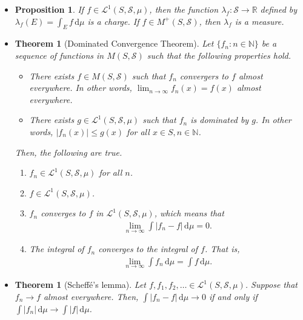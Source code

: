 \documentclass[10pt]{article}
\newtheorem{theorem}[lemma]{Theorem}
\newtheorem{proposition}[lemma]{Proposition}
\numberwithin{lemma}{section}
\newcommand{\dee}{\mathrm{d}}
\newcommand{\mcal}[1]{\mathcal{#1}}
\newcommand{\Real}{\mathbb{R}}
\newcommand{\Nat}{\mathbb{N}}
\begin{document}
\begin{itemize}
  \item \begin{proposition} \label{proposition:change-from-integral}
    If $f \in \mcal{L}^1(S,\mcal{S},\mu)$, then the function $\lambda_f : \mcal{S} \rightarrow \Real$ defined by $ \lambda_f(E) = \int_E f\, \dee\mu $ is a charge. If $f \in M^+(S,\mcal{S})$, then $\lambda_f$ is a measure.
  \end{proposition}

  \item \begin{theorem}[Dominated Convergence Theorem]
    Let $\{f_n : n \in \Nat\}$ be a sequence of functions in $M(S,\mcal{S})$ such that the following properties hold.
    \begin{itemize}
      \item There exists $f \in M(S,\mcal{S})$ such that $f_n$ convergers to $f$ almost everywhere. In other words, $\lim_{n \rightarrow \infty} f_n(x) = f(x)$ almost everywhere.
      \item There exists $g \in \mcal{L}^1(S,\mcal{S},\mu)$ such that $f_n$ is dominated by $g$. In other words, $|f_n(x)| \leq g(x)$ for all $x\in S, n \in \Nat$.
    \end{itemize}
    Then, the following are true.
    \begin{enumerate}
      \item $f_n \in \mcal{L}^1(S,\mcal{S},\mu)$ for all $n$.
      \item $f \in \mcal{L}^1(S,\mcal{S},\mu)$.
      \item $f_n$ converges to $f$ in $\mcal{L}^1(S, \mcal{S}, \mu)$, which means that
      \begin{align*}
        \lim_{n \rightarrow \infty} \int |f_n - f|\, \dee\mu = 0.
      \end{align*}
      \item The integral of $f_n$ converges to the integral of $f$. That is,
      \begin{align*}
        \lim_{n \rightarrow \infty} \int f_n\, \dee\mu = \int f\, \dee\mu.
      \end{align*}
    \end{enumerate}
  \end{theorem}

  \item \begin{theorem}[Scheff\'{e}'s lemma]
    Let $f, f_1, f_2, \dotsc \in \mcal{L}^1(S,\mcal{S},\mu)$. Suppose that $f_n \rightarrow f$ almost everywhere. Then,
    $\int |f_n - f|\, \dee\mu \rightarrow 0$ if and only if $\int |f_n|\, \dee\mu \rightarrow \int |f|\, \dee\mu$.
  \end{theorem}
\end{itemize}
\end{document}
